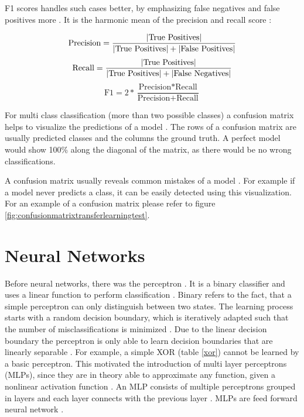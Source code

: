 \documentclass[draft,final,oneside]{vutinfth} %
\begin{document}
F1 scores handles such cases better, by emphasizing false negatives and false positives more \cite{Powers2008EvaluationFP}. It is the harmonic mean of the precision and recall score \cite{Powers2008EvaluationFP}:

\begin{equation}
\text{Precision}=\frac{|\text{True Positives}|} {|\text{True Positives}| + |\text{False Positives}|}\\
\end{equation}
\begin{equation}
\text{Recall}=\frac{|\text{True Positives}|} {|\text{True Positives}| + |\text{False Negatives}|}\\
\end{equation}
\begin{equation}
\text{F1} = 2 * \frac{\text{Precision} * \text{Recall}}{\text{Precision} + \text{Recall}}
\end{equation}

For multi class classification (more than two possible classes) a confusion matrix helps to visualize the predictions of a model \cite{accuracy}. The rows of a confusion matrix are usually predicted classes and the columns the ground truth. A perfect model would show 100\% along the diagonal of the matrix, as there would be no wrong classifications.

A confusion matrix usually reveals common mistakes of a model \cite{accuracy}. For example if a model never predicts a class, it can be easily detected using this visualization. For an example of a confusion matrix please refer to figure \ref{fig:confusionmatrixtransferlearningtest}.

\section{Neural Networks}

Before neural networks, there was the perceptron \cite{questforai}. It is a binary classifier and uses a linear function to perform classification \cite{Minsky1969PerceptronsA}. Binary refers to the fact, that a simple perceptron can only distinguish between two states. The learning process starts with a random decision boundary, which is iteratively adapted such that the number of misclassifications is minimized \cite{aimodern}. Due to the linear decision boundary the perceptron is only able to learn decision boundaries that are linearly separable \cite{questforai}. For example, a simple XOR (table \ref{xor}) cannot be learned by a basic perceptron. This motivated the introduction of multi layer perceptrons (MLPs), since they are in theory able to approximate any function, given a nonlinear activation function \cite{universalfunction}. An MLP consists of multiple perceptrons grouped in layers and each layer connects with the previous layer \cite{bishop}. MLPs are feed forward neural network \cite{bishop}.
\end{document}
